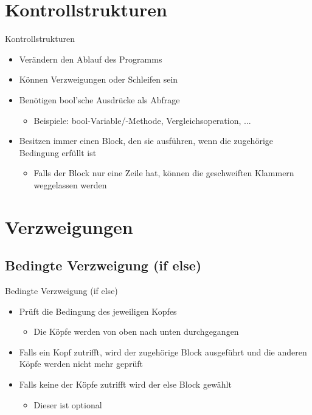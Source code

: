 \section{Kontrollstrukturen}
\begin{frame}{Kontrollstrukturen}
	\begin{itemize}
		\item Verändern den Ablauf des Programms
		\item Können Verzweigungen oder Schleifen sein
		\item Benötigen bool'sche Ausdrücke als Abfrage
		\begin{itemize}
			\item Beispiele: bool-Variable/-Methode, Vergleichsoperation, ...
		\end{itemize}
		\item Besitzen immer einen Block, den sie ausführen, wenn die zugehörige Bedingung erfüllt ist
		\begin{itemize}
			\item Falls der Block nur eine Zeile hat, können die geschweiften Klammern weggelassen werden
		\end{itemize}
	\end{itemize}
\end{frame}

\section{Verzweigungen}
\subsection{Bedingte Verzweigung (if else)}
\begin{frame}{Bedingte Verzweigung (if else)}
	\begin{itemize}
		\item Prüft die Bedingung des jeweiligen Kopfes
		\begin{itemize}
			\item Die Köpfe werden von oben nach unten durchgegangen
		\end{itemize}
		\item Falls ein Kopf zutrifft, wird der zugehörige Block ausgeführt und die anderen Köpfe werden nicht mehr geprüft
		\item Falls keine der Köpfe zutrifft wird der \alert{else} Block gewählt
		\begin{itemize}
			\item Dieser ist optional
		\end{itemize}
	\end{itemize}
	
\end{frame}

